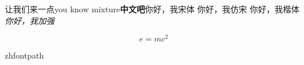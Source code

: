 \documentclass[UTF8]{article}
\begin{document}
\begin{CJK}{UTF8}{gbsn}
让我们来一点you know mixture\textbf{中文吧}{你好，我宋体}
{你好，我仿宋}
{你好，我楷体}
\emph{你好，我加强}
\end{CJK}
$$
e = mc^2
$$

\ifdefined\zhfontpath
\else
\fi
%
\ifcsname zhfontpath\endcsname
\else
\fi
\end{document}
